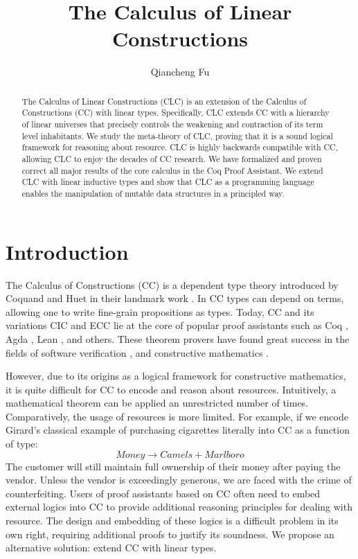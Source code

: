 \documentclass{article}
\title{The Calculus of Linear Constructions}
\author{Qiancheng Fu}
\begin{document}
  \maketitle 
  \begin{abstract}
    The Calculus of Linear Constructions (CLC) is an extension of the Calculus of Constructions (CC) with linear types. Specifically, CLC extends CC with a hierarchy of linear universes that precisely controls the weakening and contraction of its term level inhabitants. We study the meta-theory of CLC, proving that it is a sound logical framework for reasoning about resource. CLC is highly backwards compatible with CC, allowing CLC to enjoy the decades of CC research. We have formalized and proven correct all major results of the core calculus in the Coq Proof Assistant. We extend CLC with linear inductive types and show that CLC as a programming language enables the manipulation of mutable data structures in a principled way.
  \end{abstract}

  \section{Introduction}
  The Calculus of Constructions (CC) is a dependent type theory introduced by Coquand and Huet in their landmark work \cite{cc}. In CC types can depend on terms, allowing one to write fine-grain propositions as types. Today, CC and its variations CIC \cite{cic} and ECC \cite{ecc} lie at the core of popular proof assistants such as Coq \cite{coq}, Agda \cite{agda}, Lean \cite{lean}, and others. These theorem provers have found great success in the fields of software verification \cite{compcert,deepspec}, and constructive mathematics \cite{four-color,schemes}. 
  
  However, due to its origins as a logical framework for constructive mathematics, it is quite difficult for CC to encode and reason about resources. Intuitively, a mathematical theorem can be applied an unrestricted number of times. Comparatively, the usage of resources is more limited. For example, if we encode Girard's classical example \cite{girard95} of purchasing cigarettes literally into CC as a function of type:
  \begin{equation*}
    Money \rightarrow Camels + Marlboro
  \end{equation*}
  The customer will still maintain full ownership of their money after paying the vendor. Unless the vendor is exceedingly generous, we are faced with the crime of counterfeiting. Users of proof assistants based on CC often need to embed external logics into CC \cite{bedrock} to provide additional reasoning principles for dealing with resource. The design and embedding of these logics is a difficult problem in its own right, requiring additional proofs to justify its soundness. We propose an alternative solution: extend CC with linear types.
\end{document}

